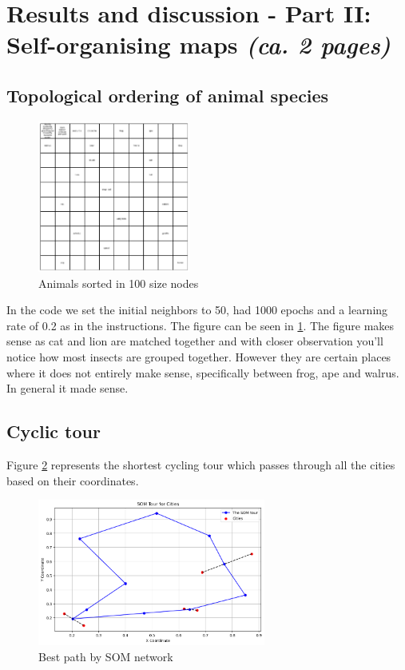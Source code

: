 \documentclass[a4paper]{article}
\begin{document}
\section{Results and discussion - Part II: Self-organising maps \normalsize{\textit{(ca. 2 pages)}}}

\subsection{Topological ordering of animal species}
\begin{figure} [htb]
    \centering
    \includegraphics[width=5cm]{Labs/Lab 2/Results/animal_som.png}
    \caption{Animals sorted in 100 size nodes}
    \label{fig:SOM_animals}
\end{figure}
In the code we set the initial neighbors to 50, had 1000 epochs and a learning rate of 0.2 as in the instructions. The figure can be seen in \ref{fig:SOM_animals}. The figure makes sense as cat and lion are matched together and with closer observation you'll notice how most insects are grouped together. However they are certain places where it does not entirely make sense, specifically between frog, ape and walrus. In general it made sense. 



\subsection{Cyclic tour}
Figure \ref{fig:SOM_cycle} represents the shortest cycling tour which passes through all the cities based on their coordinates. 
\begin{figure}[htb]
    \centering
    \includegraphics[width=7.5cm]{Labs/Lab 2/Results/Cyclic_som.png}
    \caption{Best path by SOM network}
    \label{fig:SOM_cycle}
\end{figure}
\end{document}
